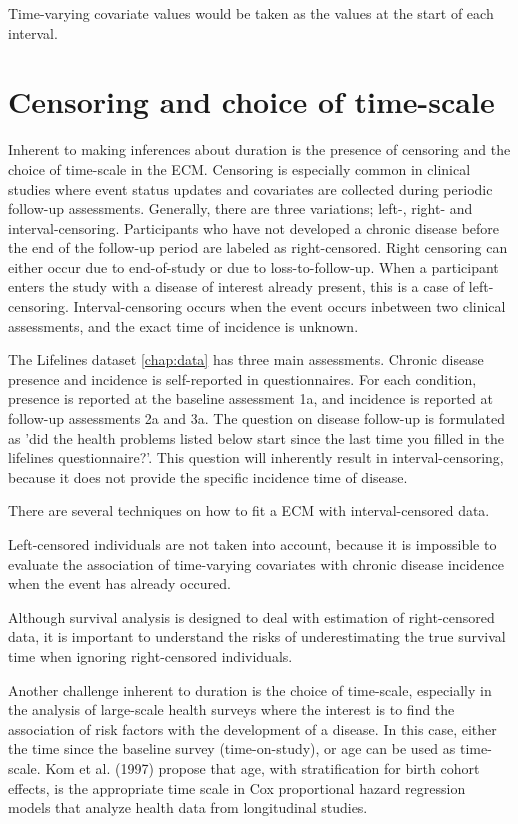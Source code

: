Time-varying covariate values would be taken as the values at the start of each interval.

\section{Censoring and choice of time-scale}
\label{section:data:timescale_censoring}
\noindent Inherent to making inferences about duration is the presence of censoring and the choice of time-scale in the ECM. Censoring is especially common in clinical studies where event status updates and covariates are collected during periodic follow-up assessments. Generally, there are three variations; left-, right- and interval-censoring. Participants who have not developed a chronic disease before the end of the follow-up period are labeled as right-censored. Right censoring can either occur due to end-of-study or due to loss-to-follow-up. When a participant enters the study with a disease of interest already present, this is a case of left-censoring. Interval-censoring occurs when the event occurs inbetween two clinical assessments, and the exact time of incidence is unknown. 

The Lifelines dataset \ref{chap:data} has three main assessments. Chronic disease presence and incidence is self-reported in questionnaires. For each condition, presence is reported at the baseline assessment 1a, and incidence is reported at follow-up assessments 2a and 3a. The question on disease follow-up is formulated as 'did the health problems listed below start since the last time you filled in the lifelines questionnaire?'. This question will inherently result in interval-censoring, because it does not provide the specific incidence time of disease. 

There are several techniques on how to fit a ECM with interval-censored data. %


Left-censored individuals are not taken into account, because it is impossible to evaluate the association of time-varying covariates with chronic disease incidence when the event has already occured.  



Although survival analysis is designed to deal with estimation of right-censored data, it is important to understand the risks of underestimating the true survival time when ignoring right-censored individuals. 

Another challenge inherent to duration is the choice of time-scale, especially in the analysis of large-scale health surveys where the interest is to find the association of risk factors with the development of a disease. In this case, either the time since the baseline survey (time-on-study), or age can be used as time-scale. %
Kom et al. (1997) \cite{kom1997time} propose that age, with stratification for birth cohort effects, is the appropriate time scale in Cox proportional hazard regression models that analyze health data from longitudinal studies.  
